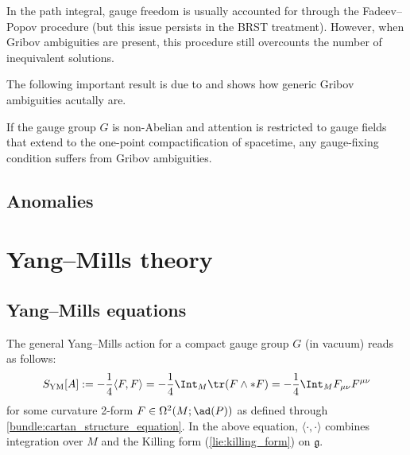 
    In the path integral, gauge freedom is usually accounted for through the Fadeev--Popov procedure (but this issue persists in the BRST treatment). However, when Gribov ambiguities are present, this procedure still overcounts the number of inequivalent solutions. 

    The following important result is due to  and shows how generic Gribov ambiguities acutally are.
    \begin{property}
        If the gauge group $G$ is non-Abelian and attention is restricted to gauge fields that extend to the one-point compactification of spacetime, any gauge-fixing condition suffers from Gribov ambiguities.
    \end{property}

\subsection{Anomalies}



\section{Yang--Mills theory}\label{section:yang_mills_theory}
\subsection{Yang--Mills equations}

    The general Yang--Mills action for a compact gauge group $G$ (in vacuum) reads as follows:
    \begin{gather}
        \label{gauge:YM_lagrangian}
        S_{\text{YM}}[A] := -\frac{1}{4}\langle F,F\rangle = -\frac{1}{4}\Int_M\tr(F\wedge\ast F) = -\frac{1}{4}\Int_MF_{\mu\nu}F^{\mu\nu}
    \end{gather}
    for some curvature 2-form $F\in\Omega^2(M;\ad(P))$ as defined through \cref{bundle:cartan_structure_equation}. In the above equation, $\langle\cdot,\cdot\rangle$ combines integration over $M$ and the Killing form (\cref{lie:killing_form}) on $\mathfrak{g}$.

